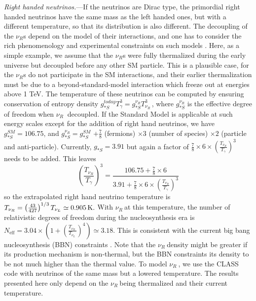 \documentclass[aps,prl,twocolumn,showpacs,superscriptaddress,groupedaddress,nofootinbib]{revtex4}  %
\newcommand{\mr}{\mathrm}
\newcommand{\K}{\ensuremath{\, {\rm K}}}
\newcommand{\nur}{\ensuremath{{\nu_R~}}}
\newcommand{\nul}{\ensuremath{{\nu_L~}}}
\begin{document}
{\it Right handed neutrinos.}---If the neutrinos are Dirac type, the 
primordial right handed neutrinos have the same mass as the left handed ones, 
but with a different temperature, so that its distribution is also different. The decoupling of 
the $\nu_R$s depend on the model of their interactions, and 
one has to consider the rich phenomenology and experimental constraints on 
such models \cite{2009RvMP...81.1199L,2014ChPhC..38i0001O}. Here, as a simple
example, we assume that the $\nu_R$s were 
fully thermalized during the early universe but decoupled before any
other SM particle. This is a plausible case, for the $\nu_R$s do not participate in 
the SM interactions, and their earlier thermalization must be due to a beyond-standard-model
interaction which freeze out at energies above 1 TeV.
The temperature of these neutrinos can be computed
by ensuring conservation of entropy density $g_{*S}^{today}T_\gamma^3
= g_{*S}^{\nu_R}T_\nur^3$, where $g_{*S}^{\nu_R}$ is the effective degree of freedom
when $\nur$ decoupled. If the Standard Model is applicable at such energy
scales except for the addition of right hand neutrinos, we have 
 $g_{*S}^{SM} = 106.75$, and $g_{*S}^{\nu_R}=g_{*S}^{SM}$
$+\frac{7}{8}$ (fermions) $ \times 3$ (number of
species) $\times 2$ (particle and anti-particle).  Currently, $g_{*S}
= 3.91$ but again a factor of
$\frac{7}{8}\times6\times(\frac{T_{\nu_R}}{T_\gamma})^3 $
needs to be added.  This leaves
\begin{equation}
\left(\frac{T_{\nu_R}}{T_\gamma}\right)^3 = \frac{106.75 + \frac{7}{8}\times6}{3.91 +
\frac{7}{8}\times6\times\left(\frac{T_{\nu_R}}{T_\gamma}\right)^3}
\end{equation}
so the extrapolated right hand neutrino temperature is 
$T_{\nu_R} 
=\left(\frac{43}{427}\right)^{1/3}T_{\nu_L} \simeq 0.905 \K .$
With \nur at this temperature, the number of relativistic degrees of
freedom during the nucleosynthesis era 
is $N_\mr{eff} = 3.04 \times (1 + (\frac{T_\nur}{T_\nul})^4)
\simeq 3.18$.  This is consistent with the current 
big bang nucleosynthesis (BBN) constraints \cite{2013PhLB..718.1162A}.
Note that the \nur density might be greater if its production 
mechanism is non-thermal, but the BBN constraints its 
density to be not much higher than the thermal value.
To model \nur, we use the CLASS code  \cite{ClassCode}
with neutrinos of the
same mass but a lowered temperature.  The results presented here
only depend on the \nur being thermalized and their current
temperature.  
\end{document}
